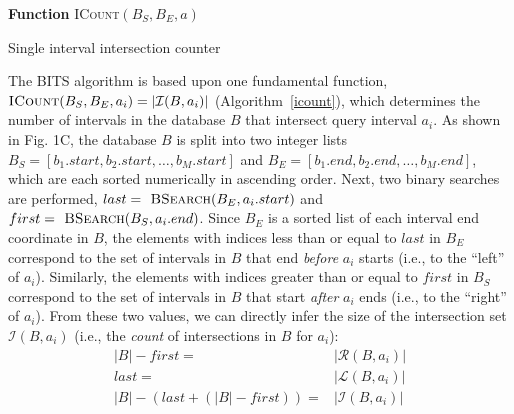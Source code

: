 \documentclass{bioinfo}
\begin{document}
\begin{algorithm}[h]
	\DontPrintSemicolon
	\footnotesize
	\BlankLine
	\textbf{Function} \textsc{ICount}$(B_S,B_E,a)$
	\caption{Single interval intersection counter}
	\label{icount}
\end{algorithm}

The BITS algorithm is based upon one fundamental function,
$\textsc{ICount}(B_S,B_E,a_i) = |\mathcal{I}(B,a_i)|$ (Algorithm~\ref{icount}),
which determines the number of intervals in the database $B$ that intersect 
query interval $a_i$.  As shown in Fig. 1C, the database $B$ is split into two 
integer lists $B_S = [b_1.start, b_2.start, \dots, b_M.start]$ and $B_E = 
[b_1.end, b_2.end, \dots, b_M.end]$, which are each sorted numerically in 
ascending order.  Next, two binary searches are performed, 
$last=\textsc{ BSearch}(B_E, a_i.start)$ and $first=\textsc{ BSearch}(B_S,
a_i.end)$.  Since $B_E$ is a sorted list of each interval end coordinate in $B$,
the elements with indices less than or equal to $last$ in $B_E$ correspond to
the set of intervals in $B$ that end \emph{before} $a_i$ starts (i.e., to the
``left'' of $a_i$).  Similarly, the elements with indices greater than or equal
to $first$ in $B_S$ correspond to the set of intervals in $B$ that start
\emph{after} $a_i$ ends (i.e., to the ``right'' of $a_i$).  From these two
values, we can directly infer the size of the intersection set
$\mathcal{I}(B,a_i)$ (i.e., the \emph{count} of intersections in $B$ for $a_i$):
\vspace{-.75em}
\begin{equation*}
	\begin{split}
		|B|-first=&|\mathcal{R}(B,a_i)| \\
		last=&|\mathcal{L}(B,a_i)| \\ 
		|B|-(last+(|B|-first))=&|\mathcal{I}(B,a_i)|
	\end{split}
\end{equation*}

\end{document}
